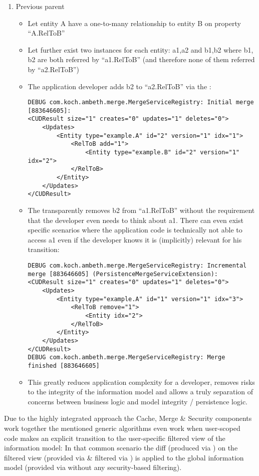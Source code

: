 \begin{enumerate}
\begin{itemize}
		\end{itemize}
	\item Previous parent
		\begin{itemize}
			\item Let entity A have a one-to-many relationship to entity B on property ``A.RelToB''
			\item Let further exist two instances for each entity: a1,a2 and b1,b2 where b1, b2 are both referred by ``a1.RelToB'' (and therefore none of them referred by ``a2.RelToB'')
			\item The application developer adds b2 to ``a2.RelToB'' via the \AMBETH{} :
\begin{lstlisting}[style=POM]		
DEBUG com.koch.ambeth.merge.MergeServiceRegistry: Initial merge [883646605]:
<CUDResult size="1" creates="0" updates="1" deletes="0">
	<Updates>
		<Entity type="example.A" id="2" version="1" idx="1">
			<RelToB add="1">
				<Entity type="example.B" id="2" version="1" idx="2">
			</RelToB>
		</Entity>
	</Updates>
</CUDResult>
\end{lstlisting}
			\item The  transparently removes b2 from ``a1.RelToB'' without the requirement that the developer even needs to think about a1. There can even exist specific scenarios where the application code is technically not able to access a1 even if the developer knows it is (implicitly) relevant for his transition:
\begin{lstlisting}[style=POM]		
DEBUG com.koch.ambeth.merge.MergeServiceRegistry: Incremental merge [883646605] (PersistenceMergeServiceExtension):
<CUDResult size="1" creates="0" updates="1" deletes="0">
	<Updates>
		<Entity type="example.A" id="1" version="1" idx="3">
			<RelToB remove="1">
				<Entity idx="2">
			</RelToB>
		</Entity>
	</Updates>
</CUDResult>
DEBUG com.koch.ambeth.merge.MergeServiceRegistry: Merge finished [883646605]
\end{lstlisting}
			\item This greatly reduces application complexity for a developer, removes risks to the integrity of the information model and allows a truly separation of concerns between business logic and model integrity / persistence logic.
		\end{itemize}
\end{enumerate}
Due to the highly integrated approach the \AMBETH{} Cache, Merge \& Security components work together the mentioned generic algorithms even work when user-scoped code makes an explicit transition to the user-specific filtered view of the information model: In that common scenario the diff (produced via ) on the filtered view (provided via  \& filtered via ) is applied to the global information model (provided via  without any security-based filtering).\\

